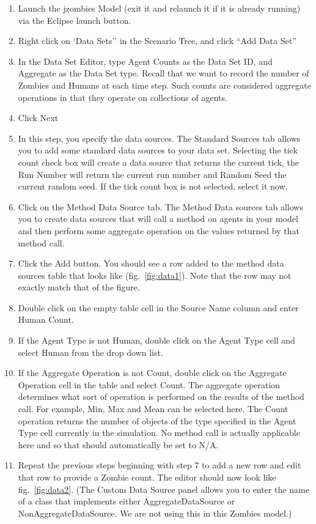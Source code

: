 \documentclass[11pt]{amsart}
\begin{document}
\vspace{.2in}
\begin{enumerate}
\item Launch the jzombies Model (exit it and relaunch it if it is already running) via the Eclipse launch button.
\item Right click on `Data Sets'' in the Scenario Tree, and click ``Add Data Set''
\item In the Data Set Editor, type Agent Counts as the Data Set ID, and Aggregate as the Data Set type. Recall that we want to 
record the number of Zombies and Humans at each time step. Such counts are considered aggregate operations in that they operate on collections of agents.
\item Click Next
\item In this step, you specify the data sources. The Standard Sources tab allows you to add some standard data sources to your data set. Selecting the tick count check box will create a data source that returns the current tick, the Run Number will return the current run number and Random Seed the current random seed. If the tick count box is not selected, select it now.
\item Click on the Method Data Source tab. The Method Data sources tab allows you to create data sources that will call a method on agents in your model and then perform some aggregate operation on the values returned by that method call.
\item Click the Add button. You should see a row added to the method data sources table that looks like  (fig.~\ref{fig:data1}). Note that the row may not exactly match that of the figure.
\item Double click on the empty table cell in the Source Name column and enter Human Count. 
\item If the Agent Type is not Human, double click on the Agent Type cell and select Human from the drop down list.
\item If the Aggregate Operation is not Count, double click on the Aggregate Operation cell in the table and select Count. The aggregate operation determines what sort of operation is performed on the results of the method call. For example, Min, Max and Mean can be selected here. The Count operation returns the number of objects of the type specified in the Agent Type cell currently in the simulation. No method call is actually applicable here and so that should automatically be set to N/A.
\item Repeat the previous steps beginning with step 7 to add a new row and edit that row to provide a Zombie count. The editor should now look like fig.~\ref{fig:data2}. (The Custom Data Source panel allows you to enter the name of a class that implements either AggregateDataSource or NonAggregateDataSource. We are not using this in this Zombies model.)

\end{enumerate}
\end{document}
